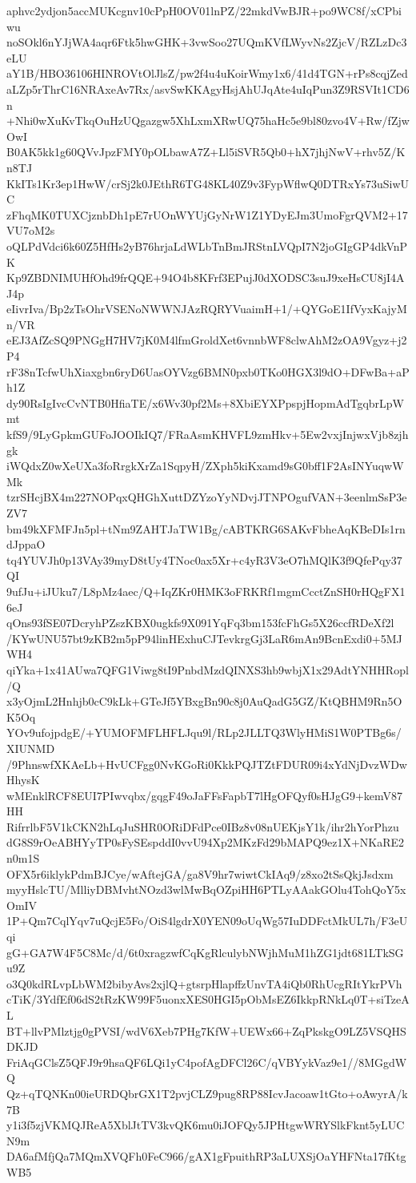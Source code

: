 aphvc2ydjon5accMUKcgnv10cPpH0OV01lnPZ/22mkdVwBJR+po9WC8f/xCPbiwu
noSOkl6nYJjWA4aqr6Ftk5hwGHK+3vwSoo27UQmKVfLWyvNs2ZjcV/RZLzDc3eLU
aY1B/HBO36106HINROVtOlJlsZ/pw2f4u4uKoirWmy1x6/41d4TGN+rPs8cqjZed
aLZp5rThrC16NRAxeAv7Rx/asvSwKKAgyHsjAhUJqAte4uIqPun3Z9RSVIt1CD6n
+Nhi0wXuKvTkqOuHzUQgazgw5XhLxmXRwUQ75haHc5e9bl80zvo4V+Rw/fZjwOwI
B0AK5kk1g60QVvJpzFMY0pOLbawA7Z+Ll5iSVR5Qb0+hX7jhjNwV+rhv5Z/Kn8TJ
KkITs1Kr3ep1HwW/crSj2k0JEthR6TG48KL40Z9v3FypWflwQ0DTRxYs73uSiwUC
zFhqMK0TUXCjznbDh1pE7rUOnWYUjGyNrW1Z1YDyEJm3UmoFgrQVM2+17VU7oM2s
oQLPdVdci6k60Z5HfHs2yB76hrjaLdWLbTnBmJRStnLVQpI7N2joGIgGP4dkVnPK
Kp9ZBDNIMUHfOhd9frQQE+94O4b8KFrf3EPujJ0dXODSC3suJ9xeHsCU8jI4AJ4p
eIivrIva/Bp2zTsOhrVSENoNWWNJAzRQRYVuaimH+1/+QYGoE1IfVyxKajyMn/VR
eEJ3AfZcSQ9PNGgH7HV7jK0M4lfmGroldXet6vnnbWF8clwAhM2zOA9Vgyz+j2P4
rF38nTcfwUhXiaxgbn6ryD6UasOYVzg6BMN0pxb0TKo0HGX3l9dO+DFwBa+aPh1Z
dy90RsIgIvcCvNTB0HfiaTE/x6Wv30pf2Ms+8XbiEYXPpspjHopmAdTgqbrLpWmt
kfS9/9LyGpkmGUFoJOOIkIQ7/FRaAsmKHVFL9zmHkv+5Ew2vxjInjwxVjb8zjhgk
iWQdxZ0wXeUXa3foRrgkXrZa1SqpyH/ZXph5kiKxamd9sG0bff1F2AsINYuqwWMk
tzrSHcjBX4m227NOPqxQHGhXuttDZYzoYyNDvjJTNPOgufVAN+3eenlmSsP3eZV7
bm49kXFMFJn5pl+tNm9ZAHTJaTW1Bg/cABTKRG6SAKvFbheAqKBeDIs1rndJppaO
tq4YUVJh0p13VAy39myD8tUy4TNoc0ax5Xr+c4yR3V3eO7hMQlK3f9QfePqy37QI
9ufJu+iJUku7/L8pMz4aec/Q+IqZKr0HMK3oFRKRf1mgmCcctZnSH0rHQgFX16eJ
qOns93fSE07DcryhPZszKBX0ugkfs9X091YqFq3bm153fcFhGs5X26ccfRDeXf2l
/KYwUNU57bt9zKB2m5pP94linHExhuCJTevkrgGj3LaR6mAn9BcnExdi0+5MJWH4
qiYka+1x41AUwa7QFG1Viwg8tI9PnbdMzdQINXS3hb9wbjX1x29AdtYNHHRopl/Q
x3yOjmL2Hnhjb0cC9kLk+GTeJf5YBxgBn90c8j0AuQadG5GZ/KtQBHM9Rn5OK5Oq
YOv9ufojpdgE/+YUMOFMFLHFLJqu9l/RLp2JLLTQ3WlyHMiS1W0PTBg6s/XIUNMD
/9PhnswfXKAeLb+HvUCFgg0NvKGoRi0KkkPQJTZtFDUR09i4xYdNjDvzWDwHhysK
wMEnklRCF8EUI7PIwvqbx/gqgF49oJaFFsFapbT7lHgOFQyf0sHJgG9+kemV87HH
RifrrlbF5V1kCKN2hLqJuSHR0ORiDFdPce0IBz8v08nUEKjsY1k/ihr2hYorPhzu
dG8S9rOeABHYyTP0sFySEspddI0vvU94Xp2MKzFd29bMAPQ9ez1X+NKaRE2n0m1S
OFX5r6iklykPdmBJCye/wAftejGA/ga8V9hr7wiwtCkIAq9/z8xo2tSsQkjJsdxm
myyHslcTU/MlliyDBMvhtNOzd3wlMwBqOZpiHH6PTLyAAakGOlu4TohQoY5xOmIV
1P+Qm7CqlYqv7uQcjE5Fo/OiS4lgdrX0YEN09oUqWg57IuDDFctMkUL7h/F3eUqi
gG+GA7W4F5C8Mc/d/6t0xragzwfCqKgRlculybNWjhMuM1hZG1jdt681LTkSGu9Z
o3Q0kdRLvpLbWM2bibyAvs2xjlQ+gtsrpHlapffzUnvTA4iQb0RhUcgRItYkrPVh
cTiK/3YdfEf06dS2tRzKW99F5uonxXES0HGI5pObMsEZ6IkkpRNkLq0T+siTzeAL
BT+llvPMlztjg0gPVSI/wdV6Xeb7PHg7KfW+UEWx66+ZqPkskgO9LZ5VSQHSDKJD
FriAqGClsZ5QFJ9r9hsaQF6LQi1yC4pofAgDFCl26C/qVBYykVaz9e1//8MGgdWQ
Qz+qTQNKn00ieURDQbrGX1T2pvjCLZ9pug8RP88IcvJacoaw1tGto+oAwyrA/k7B
y1i3f5zjVKMQJReA5XblJtTV3kvQK6mu0iJOFQy5JPHtgwWRYSlkFknt5yLUCN9m
DA6afMfjQa7MQmXVQFh0FeC966/gAX1gFpuithRP3aLUXSjOaYHFNta17fKtgWB5
